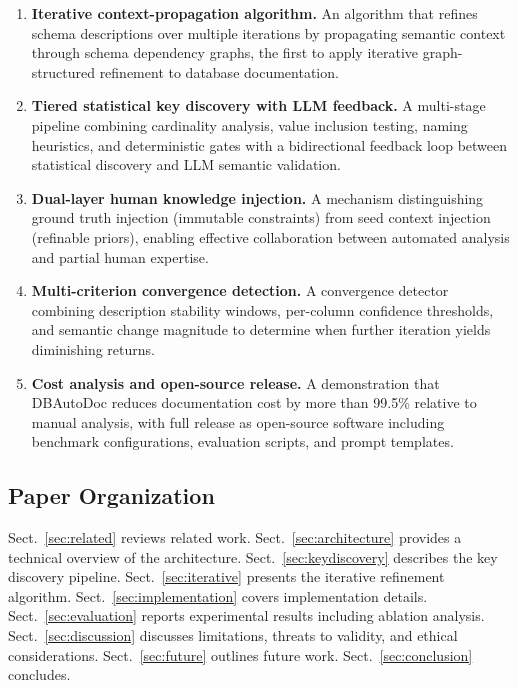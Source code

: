 \documentclass[twocolumn]{svjour3}
\begin{document}
\begin{enumerate}
    \item \textbf{Iterative context-propagation algorithm.} An algorithm that refines schema descriptions over multiple iterations by propagating semantic context through schema dependency graphs, the first to apply iterative graph-structured refinement to database documentation.

    \item \textbf{Tiered statistical key discovery with LLM feedback.} A multi-stage pipeline combining cardinality analysis, value inclusion testing, naming heuristics, and deterministic gates with a bidirectional feedback loop between statistical discovery and LLM semantic validation.

    \item \textbf{Dual-layer human knowledge injection.} A mechanism distinguishing ground truth injection (immutable constraints) from seed context injection (refinable priors), enabling effective collaboration between automated analysis and partial human expertise.

    \item \textbf{Multi-criterion convergence detection.} A convergence detector combining description stability windows, per-column confidence thresholds, and semantic change magnitude to determine when further iteration yields diminishing returns.

    \item \textbf{Cost analysis and open-source release.} A demonstration that DBAutoDoc reduces documentation cost by more than 99.5\% relative to manual analysis, with full release as open-source software including benchmark configurations, evaluation scripts, and prompt templates.
\end{enumerate}

\subsection{Paper Organization}

Sect.~\ref{sec:related} reviews related work. Sect.~\ref{sec:architecture} provides a technical overview of the architecture. Sect.~\ref{sec:keydiscovery} describes the key discovery pipeline. Sect.~\ref{sec:iterative} presents the iterative refinement algorithm. Sect.~\ref{sec:implementation} covers implementation details. Sect.~\ref{sec:evaluation} reports experimental results including ablation analysis. Sect.~\ref{sec:discussion} discusses limitations, threats to validity, and ethical considerations. Sect.~\ref{sec:future} outlines future work. Sect.~\ref{sec:conclusion} concludes.
\end{document}
